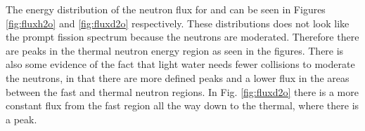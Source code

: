 \documentclass[norsk,a4paper,12pt]{article}
\begin{document}
\begin{multicols}{2}


The energy distribution of the neutron flux for  and  can be seen in Figures \ref{fig:fluxh2o} and \ref{fig:fluxd2o} respectively. These distributions does not look like the prompt fission spectrum because the neutrons are moderated. Therefore there are peaks in the thermal neutron energy region as seen in the figures. There is also some evidence of the fact that light water needs fewer collisions to moderate the neutrons, in that there are more defined peaks and a lower flux in the areas between the fast and thermal neutron regions. In Fig. \ref{fig:fluxd2o} there is a more constant flux from the fast region all the way down to the thermal, where there is a peak. 




\end{multicols}
\end{document}
